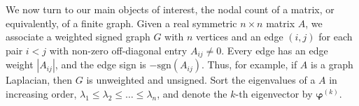 \documentclass[reqno]{amsart}
\numberwithin{equation}{section}
\begin{document}
We now turn to our main objects of interest, the nodal count of a matrix, or equivalently, of a finite graph. 
Given a real symmetric $n\times n$ matrix $A$, we associate a weighted signed graph $G$ with $n$ vertices and an edge $(i,j)$ for each pair $i<j$ with non-zero off-diagonal entry $A_{ij}\ne0 $. 
Every edge has an edge weight $|A_{ij}|$, and the edge sign is $-\mathrm{sgn}(A_{ij})$. Thus, for example, if $A$ is a graph Laplacian, then $G$ is unweighted and unsigned. Sort the eigenvalues of a $A$ in increasing order, $\lambda_{1}\le\lambda_{2}\le\ldots\le \lambda_{n}$, and denote the $k$-th eigenvector by $\bm \varphi^{(k)}$. 
\end{document}
